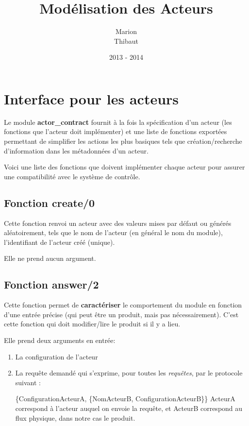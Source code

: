 \documentclass[12pt,a4paper]{article}
\title{\textbf{Modélisation des Acteurs}}
\author{Marion \familyname{Ly} \\ Thibaut \familyname{Smith}}
\date{2013 - 2014}
\begin{document}
	\maketitle

	\tableofcontents

	\pagebreak

	\section{Interface pour les acteurs}

	Le module \textbf{actor\_contract} fournit à la fois la spécification d'un 
	acteur (les fonctions que l'acteur doit implémenter) et une liste de 
	fonctions exportées permettant de simplifier les actions les plus basiques 
	tels que création/recherche d'information dans les métadonnées d'un acteur.

	Voici une liste des fonctions que doivent implémenter chaque acteur pour 
	assurer une compatibilité avec le système de contrôle. 


	\subsection{Fonction create/0}
		Cette fonction renvoi un acteur avec des valeurs mises par défaut ou
		générés aléatoirement, tels que le nom de l'acteur (en général le nom
		du module), l'identifiant de l'acteur créé (unique).

		Elle ne prend aucun argument.

	\subsection{Fonction answer/2}
		Cette fonction permet de \textbf{caractériser} le comportement du 
		module en fonction d'une entrée précise (qui peut être un produit, mais
		pas nécessairement). C'est cette fonction qui doit modifier/lire le 
		produit si il y a lieu.

		Elle prend deux arguments en entrée:

		\begin{enumerate}
			\item La configuration de l'acteur
			\item La requête demandé qui s'exprime, pour toutes les 
			\textit{requêtes}, par le protocole suivant :

				\{ConfigurationActeurA, 
				\{NomActeurB, ConfigurationActeurB\}\}
				ActeurA correspond à l'acteur auquel on envoie la requête, et 
				ActeurB correspond au flux physique, dans notre cas le produit.
		\end{enumerate}
\end{document}
